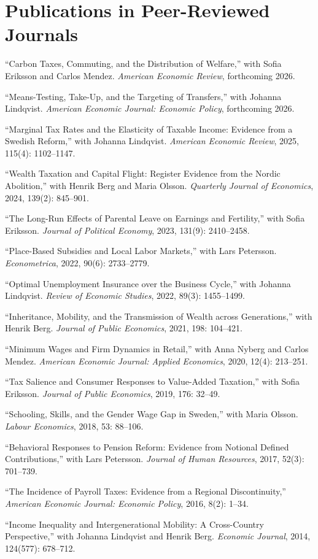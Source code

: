 \documentclass[11pt]{article}
\newcommand{\NEW}[1]{\textcolor{newgreen}{#1}}%
\newcommand{\NEW}[1]{#1}%
\newcommand{\pubitem}[1]{\item #1}
\begin{document}
\section{Publications in Peer-Reviewed Journals}
\begin{cvlist}
\pubitem{\NEW{``Carbon Taxes, Commuting, and the Distribution of Welfare,'' with Sofia Eriksson and Carlos Mendez. \emph{American Economic Review}, forthcoming 2026.}}
\pubitem{\NEW{``Means-Testing, Take-Up, and the Targeting of Transfers,'' with Johanna Lindqvist. \emph{American Economic Journal: Economic Policy}, forthcoming 2026.}}
\pubitem{``Marginal Tax Rates and the Elasticity of Taxable Income: Evidence from a Swedish Reform,'' with Johanna Lindqvist. \emph{American Economic Review}, 2025, 115(4): 1102--1147.}
\pubitem{``Wealth Taxation and Capital Flight: Register Evidence from the Nordic Abolition,'' with Henrik Berg and Maria Olsson. \emph{Quarterly Journal of Economics}, 2024, 139(2): 845--901.}
\pubitem{``The Long-Run Effects of Parental Leave on Earnings and Fertility,'' with Sofia Eriksson. \emph{Journal of Political Economy}, 2023, 131(9): 2410--2458.}
\pubitem{``Place-Based Subsidies and Local Labor Markets,'' with Lars Petersson. \emph{Econometrica}, 2022, 90(6): 2733--2779.}
\pubitem{``Optimal Unemployment Insurance over the Business Cycle,'' with Johanna Lindqvist. \emph{Review of Economic Studies}, 2022, 89(3): 1455--1499.}
\pubitem{``Inheritance, Mobility, and the Transmission of Wealth across Generations,'' with Henrik Berg. \emph{Journal of Public Economics}, 2021, 198: 104--421.}
\pubitem{``Minimum Wages and Firm Dynamics in Retail,'' with Anna Nyberg and Carlos Mendez. \emph{American Economic Journal: Applied Economics}, 2020, 12(4): 213--251.}
\pubitem{``Tax Salience and Consumer Responses to Value-Added Taxation,'' with Sofia Eriksson. \emph{Journal of Public Economics}, 2019, 176: 32--49.}
\pubitem{``Schooling, Skills, and the Gender Wage Gap in Sweden,'' with Maria Olsson. \emph{Labour Economics}, 2018, 53: 88--106.}
\pubitem{``Behavioral Responses to Pension Reform: Evidence from Notional Defined Contributions,'' with Lars Petersson. \emph{Journal of Human Resources}, 2017, 52(3): 701--739.}
\pubitem{``The Incidence of Payroll Taxes: Evidence from a Regional Discontinuity,'' \emph{American Economic Journal: Economic Policy}, 2016, 8(2): 1--34.}
\pubitem{``Income Inequality and Intergenerational Mobility: A Cross-Country Perspective,'' with Johanna Lindqvist and Henrik Berg. \emph{Economic Journal}, 2014, 124(577): 678--712.}
\end{cvlist}
\end{document}
